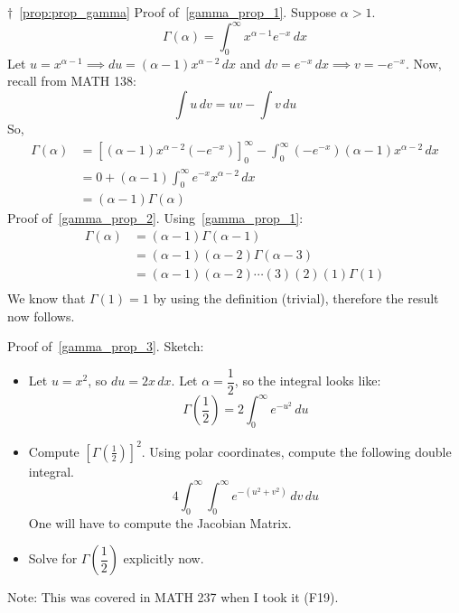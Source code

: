 \begin{Proof}{$ \dagger $~\ref{prop:prop_gamma}}{}
    Proof of~\ref{gamma_prop_1}. Suppose $ \alpha>1 $.
    \[ \Gamma(\alpha)=\int_{0}^{\infty} x^{\alpha-1}e^{-x}\, d{x}  \]
    Let $ u=x^{\alpha-1} \implies du=(\alpha-1)x^{\alpha-2}\,dx $ and $ dv=e^{-x}\,dx\implies v=-e^{-x} $. Now,
    recall from MATH 138:
    \[ \int u\, d{v} =uv-\int v\, d{u} \]
    So,
    \begin{align*}
        \Gamma(\alpha)
         & = \left[ (\alpha-1)x^{\alpha-2}\left( -e^{-x} \right) \right]_0^\infty-\int_{0}^{\infty}\left(-e^{-x}\right)
        (\alpha-1)x^{\alpha-2}\, d{x}                                                                                   \\
         & =0+(\alpha-1)\int_{0}^{\infty}e^{-x} x^{\alpha-2}\, d{x}                                                     \\
         & =(\alpha-1)\Gamma(\alpha)
    \end{align*}
    Proof of~\ref{gamma_prop_2}. Using~\ref{gamma_prop_1}:
    \begin{align*}
        \Gamma(\alpha)
         & =(\alpha-1)\Gamma(\alpha-1)                    \\
         & =(\alpha-1)(\alpha-2)\Gamma(\alpha-3)          \\
         & =(\alpha-1)(\alpha-2)\cdots (3)(2)(1)\Gamma(1) \\
    \end{align*}
    We know that $ \Gamma(1)=1 $ by using the definition (trivial), therefore the result now follows.

    Proof of~\ref{gamma_prop_3}. Sketch:
    \begin{itemize}
        \item Let $ u=x^2 $, so $ du=2x\,dx $. Let $ \alpha=\dfrac{1}{2} $, so the integral looks like:
              \[ \Gamma\left( \frac{1}{2}  \right)=2\int_{0}^{\infty} e^{-u^2}\, d{u}  \]
        \item Compute $ \left[ \Gamma \left( \frac{1}{2}  \right) \right]^2 $. Using polar coordinates,
              compute the following double integral.
              \[ 4 \int_{0}^{\infty} \int_{0}^{\infty} e^{-(u^2+v^2)}\, d{v} \, d{u}  \]
              One will have to compute the Jacobian Matrix.
        \item Solve for $ \Gamma\left( \dfrac{1}{2} \right) $ explicitly now.
    \end{itemize}
    Note: This was covered in MATH 237 when I took it (F19).
\end{Proof}

